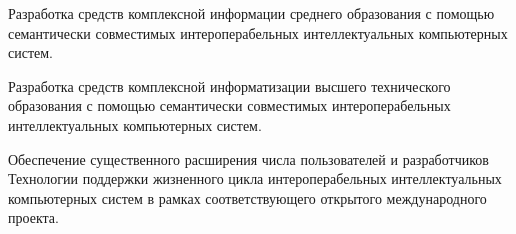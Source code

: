 \begin{textitemize}
	\medskip
	\item Разработка средств комплексной информации среднего образования с помощью семантически совместимых интероперабельных интеллектуальных компьютерных систем.
	\medskip
	\item Разработка средств комплексной информатизации высшего технического образования с помощью семантически совместимых интероперабельных интеллектуальных компьютерных систем.
	\medskip
	\item Обеспечение существенного расширения числа пользователей и разработчиков Технологии поддержки жизненного цикла интероперабельных интеллектуальных компьютерных систем в рамках соответствующего открытого международного проекта.
\end{textitemize}
